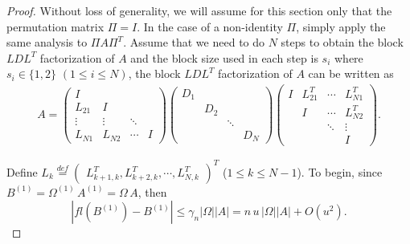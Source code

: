 \documentclass[11pt]{article}
\begin{document}
\begin{proof}
Without loss of generality, we will assume for this section only that the permutation matrix $\Pi = I$. In the case of a non-identity $\Pi$, simply apply the same analysis to $\Pi A \Pi^T$. Assume that we need to do $N$ steps to obtain the block $LDL^T$ factorization of $A$ and the block size used in each step is $s_i$ where $s_i \in \{1,2\}$ $(1 \le i \le N)$, the block $LDL^T$ factorization of $A$ can be written as 
\begin{align*}
A = \begin{pmatrix}
I &  & & \\
L_{21} & I & & \\
\vdots & \vdots  &\ddots & \\
L_{N1} & L_{N2} & \cdots & I 
\end{pmatrix} \begin{pmatrix}
D_1  &  &  &  \\
&  D_2 &  &  \\
&  &  \ddots &  \\
&   &   &   D_N
\end{pmatrix} \begin{pmatrix}
I & L_{21}^T  & \cdots &  L_{N1}^T \\
& I  &  \cdots &  L_{N2}^T  \\
&   &  \ddots  & \vdots \\
&   &   & I
\end{pmatrix} 
.
\end{align*}

Define $L_k \stackrel{def}{=} \begin{pmatrix}
L_{k+1,k}^T, L_{k+2,k}^T, \cdots, L_{N,k}^T
\end{pmatrix}^T$ ($1 \le k \le N-1$).
To begin, since $B^{(1)} = \Omega^{(1)} \, A^{(1)} = \Omega \, A$, then
$$\left|fl\left(B^{(1)}\right) - B^{(1)} \right| \le \gamma_n |\Omega| |A| = n \, u \, |\Omega| |A| + O(u^2).$$


\end{proof}
\end{document}
